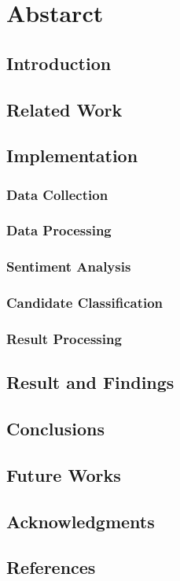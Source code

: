 \documentclass{acm_proc_article-sp}
\begin{document}
\section{Abstarct}
\subsection{Introduction}
\subsection{Related Work}
\subsection{Implementation}
\subsubsection{Data Collection}
\subsubsection{Data Processing}
\subsubsection{Sentiment Analysis}
\subsubsection{Candidate Classification}
\subsubsection{Result Processing}
\subsection{Result and Findings}
\subsection{Conclusions}
\subsection{Future Works}
\subsection{Acknowledgments}
\subsection{References}

\end{document}

